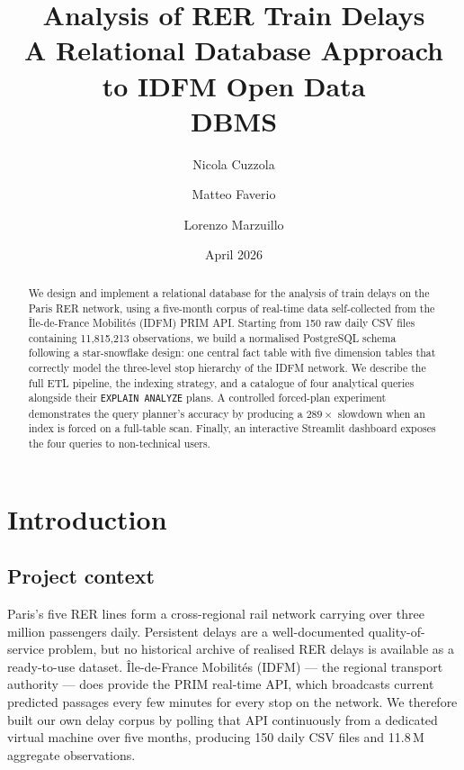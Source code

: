 \documentclass[a4paper,11pt]{article}
\title{
  \textbf{Analysis of RER Train Delays} \\[0.4em]
  \large A Relational Database Approach to IDFM Open Data \\[1.5em]
  \normalsize DBMS
}
\author{
  Nicola Cuzzola \and
  Matteo Faverio \and
  Lorenzo Marzuillo
}
\date{April 2026}
\begin{document}

\maketitle

\begin{abstract}
We design and implement a relational database for the analysis of train delays on the
Paris RER network, using a five-month corpus of real-time data self-collected from
the \^{I}le-de-France Mobilit\'{e}s (IDFM) PRIM API.
Starting from 150 raw daily CSV files containing 11,815,213 observations, we build
a normalised PostgreSQL schema following a star-snowflake design: one central fact
table with five dimension tables that correctly model the three-level stop hierarchy
of the IDFM network.
We describe the full ETL pipeline, the indexing strategy, and a catalogue of four
analytical queries alongside their \texttt{EXPLAIN ANALYZE} plans.
A controlled forced-plan experiment demonstrates the query planner's accuracy by
producing a $289\times$ slowdown when an index is forced on a full-table scan.
Finally, an interactive Streamlit dashboard exposes the four queries to non-technical
users.
\end{abstract}

\setcounter{tocdepth}{2}
\tableofcontents
\newpage


\section{Introduction}
\label{sec:intro}

\subsection{Project context}

Paris's five RER lines form a cross-regional rail network carrying over three million
passengers daily.
Persistent delays are a well-documented quality-of-service problem, but no
historical archive of realised RER delays is available as a ready-to-use dataset.
\^{I}le-de-France Mobilit\'{e}s (IDFM) --- the regional transport authority ---
does provide the PRIM real-time API, which broadcasts current predicted passages
every few minutes for every stop on the network.
We therefore built our own delay corpus by polling that API continuously from a
dedicated virtual machine over five months, producing 150 daily CSV files and
11.8\,M aggregate observations.
\end{document}

